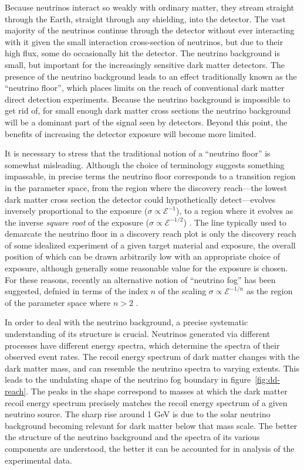 \documentclass[b5paper, 10pt, twoside]{book}
\begin{document}
Because neutrinos interact so weakly with ordinary matter, they stream straight through the Earth, straight through any shielding, into the detector. The vast majority of the neutrinos continue through the detector without ever interacting with it given the small interaction cross-section of neutrinos, but due to their high flux, some do occasionally hit the detector. The neutrino background is small, but important for the increasingly sensitive dark matter detectors. The presence of the neutrino background leads to an effect traditionally known as the ``neutrino floor'', which places limits on the reach of conventional dark matter direct detection experiments. Because the neutrino background is impossible to get rid of, for small enough dark matter cross sections the neutrino background will be a dominant part of the signal seen by detectors. Beyond this point, the benefits of increasing the detector exposure will become more limited.

It is necessary to stress that the traditional notion of a ``neutrino floor'' is somewhat misleading. Although the choice of terminology suggests something impassable, in precise terms the neutrino floor corresponds to a transition region in the parameter space, from the region where the discovery reach---the lowest dark matter cross section the detector could hypothetically detect---evolves inversely proportional to the exposure ($\sigma\propto \mathcal{E}^{-1}$), to a region where it evolves as the inverse \emph{square root} of the exposure ($\sigma\propto \mathcal{E}^{-1/2}$) \parencite{BillardFigueroaFelicianoStrigari2014}. The line typically used to demarcate the neutrino floor in a discovery reach plot is only the discovery reach of some idealized experiment of a given target material and exposure, the overall position of which can be drawn arbitrarily low with an appropriate choice of exposure, although generally some reasonable value for the exposure is chosen. For these reasons, recently an alternative notion of ``neutrino fog'' has been suggested, defnied in terms of the index $n$ of the scaling $\sigma\propto \mathcal{E}^{-1/n}$ as the region of the parameter space where $n>2$ \parencites{OHare2021, CarewEtAl2024}.

In order to deal with the neutrino background, a precise systematic understanding of its structure is crucial. Neutrinos generated via different processes have different energy spectra, which determine the spectra of their observed event rates. The recoil energy spectrum of dark matter changes with the dark matter mass, and can resemble the neutrino spectra to varying extents. This leads to the undulating shape of the neutrino fog boundary in figure~\ref{fig:dd-reach}. The peaks in the shape correspond to masses at which the dark matter recoil energy spectrum precisely matches the recoil energy spectrum of a given neutrino source. The sharp rise around 1 GeV is due to the solar neutrino background becoming relevant for dark matter below that mass scale. The better the structure of the neutrino background and the spectra of its various components are understood, the better it can be accounted for in analysis of the experimental data.
\end{document}
